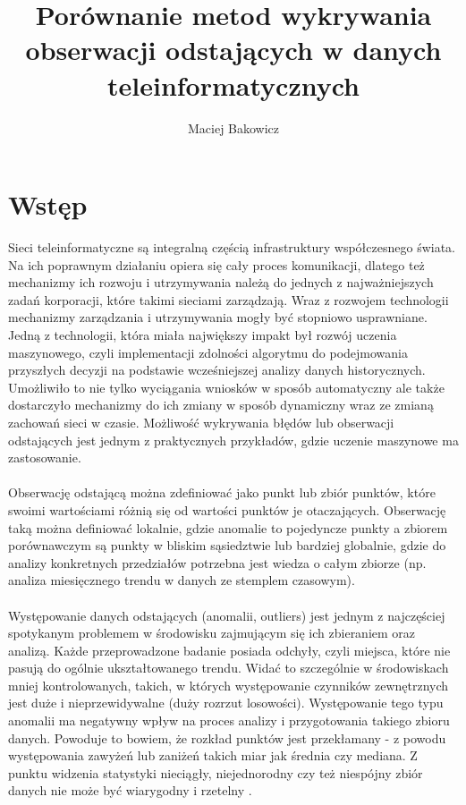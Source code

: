 \documentclass[eng,printmode]{mgr}
\title{Porównanie metod wykrywania obserwacji odstających w danych teleinformatycznych}
\author{Maciej Bakowicz}
\begin{document}

\maketitle 

\tableofcontents 

\chapter{Wstęp}  
Sieci teleinformatyczne są integralną częścią infrastruktury współczesnego świata. Na ich poprawnym działaniu opiera się cały proces komunikacji, dlatego też mechanizmy ich rozwoju i utrzymywania należą do jednych z najważniejszych zadań korporacji, które takimi sieciami zarządzają. Wraz z rozwojem technologii mechanizmy zarządzania i utrzymywania mogły być stopniowo usprawniane. Jedną z technologii, która miała największy impakt był rozwój uczenia maszynowego, czyli implementacji zdolności algorytmu do podejmowania przyszłych decyzji na podstawie wcześniejszej analizy danych historycznych. Umożliwiło to nie tylko wyciągania wniosków w sposób automatyczny ale także dostarczyło mechanizmy do ich zmiany w sposób dynamiczny wraz ze zmianą zachowań sieci w czasie. Możliwość wykrywania błędów lub obserwacji odstających jest jednym z praktycznych przykładów, gdzie uczenie maszynowe ma zastosowanie.
\\\\
Obserwację odstającą można zdefiniować jako punkt lub zbiór punktów, które swoimi wartościami różnią się od wartości punktów je otaczających. Obserwację taką można definiować lokalnie, gdzie anomalie to pojedyncze punkty a zbiorem porównawczym są punkty w bliskim sąsiedztwie lub bardziej globalnie, gdzie do analizy konkretnych przedziałów potrzebna jest wiedza o całym zbiorze (np. analiza miesięcznego trendu w danych ze stemplem czasowym). 
\\ \\
Występowanie danych odstających (anomalii, outliers) jest jednym z najczęściej spotykanym problemem w środowisku zajmującym się ich zbieraniem oraz analizą. Każde przeprowadzone badanie posiada odchyły, czyli miejsca, które nie pasują do ogólnie ukształtowanego trendu. Widać to szczególnie w środowiskach mniej kontrolowanych, takich, w których występowanie czynników zewnętrznych jest duże i nieprzewidywalne (duży rozrzut losowości). Występowanie tego typu anomalii ma negatywny wpływ na proces analizy i przygotowania takiego zbioru danych. Powoduje to bowiem, że rozkład punktów jest przekłamany - z powodu występowania zawyżeń lub zaniżeń takich miar jak średnia czy mediana. Z punktu widzenia statystyki nieciągły, niejednorodny czy też niespójny zbiór danych nie może być wiarygodny i rzetelny \cite{outliers-impact}.
\end{document}
